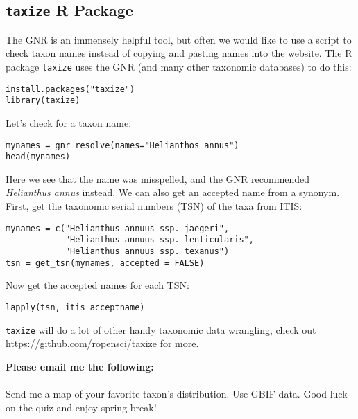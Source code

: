 \documentclass[11pt]{article}
\begin{document}
\subsection{\texttt{taxize} R Package}

The GNR is an immensely helpful tool, but often we would like to use 
a script to check taxon names instead of copying and pasting names into the website.
The R package \texttt{taxize} uses the GNR (and many other taxonomic databases)
to do this:

\begin{verbatim}
install.packages("taxize")
library(taxize)
\end{verbatim}

Let's check for a taxon name:

\begin{verbatim}
mynames = gnr_resolve(names="Helianthos annus")
head(mynames)
\end{verbatim}

Here we see that the name was misspelled, and the GNR recommended \textit{Helianthus annus} instead.
We can also get an accepted name from a synonym.
First, get the taxonomic serial numbers (TSN) of the taxa from ITIS:

\begin{verbatim}
mynames = c("Helianthus annuus ssp. jaegeri", 
            "Helianthus annuus ssp. lenticularis", 
            "Helianthus annuus ssp. texanus")
tsn = get_tsn(mynames, accepted = FALSE)
\end{verbatim}

Now get the accepted names for each TSN:

\begin{verbatim}
lapply(tsn, itis_acceptname)
\end{verbatim}

\texttt{taxize} will do a lot of other handy taxonomic data wrangling,
check out \url{https://github.com/ropensci/taxize} for more.


\begin{framed}
\noindent
\textbf{Please email me the following:} \\
\\
Send me a map of your favorite taxon's distribution. 
Use GBIF data.
Good luck on the quiz and enjoy spring break!
\end{framed}

%
% 
\end{document}
